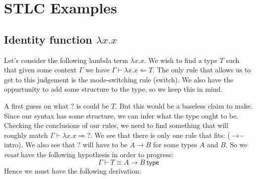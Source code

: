 \section{STLC Examples}

\subsection{Identity function \texorpdfstring{$\lambda x . x$}{}}

\begin{example}\label{identity}
    Let's consider the following lambda term $\lambda x . x$. We wish to find a type $T$ such that given some context $\Gamma$ we have $\Gamma \vdash \lambda x . x \Leftarrow T$. The only rule that allows us to get to this judgement is the mode-switching rule (switch). We also have the oppurtunity to add some structure to the type, so we keep this in mind.
    \begin{prooftree}
    \end{prooftree}
    
    A first guess on what $\boxed{?}$ is could be $T$. But this would be a baseless claim to make. Since our syntax has some structure, we can infer what the type ought to be. Checking the conclusions of our rules, we need to find something that will roughly match $\Gamma \vdash \lambda x . x \Rightarrow \boxed{?}$. We see that there is only one rule that fits: ($\to$-intro). We also see that $\boxed{?}$ will have to be $A \to B$ for some types $A$ and $B$. So we \emph{must} have the following hypothesis in order to progress:
    \begin{equation*}
        \Gamma \vdash T \equiv A \to B\ \mathsf{type} \tag{$*$}
    \end{equation*}
     Hence we must have the following derivation:
     
     \begin{prooftree}
     \end{prooftree}
     

\end{example}
